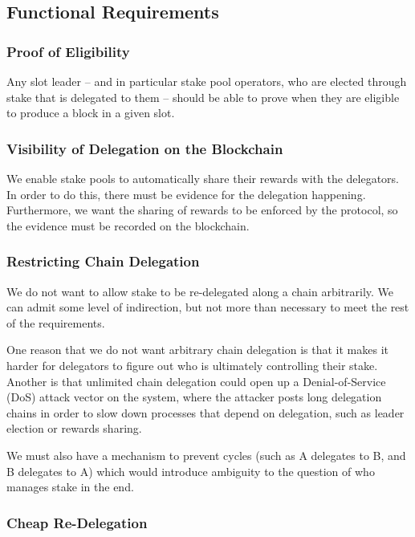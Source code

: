 \documentclass[11pt,a4paper,dvipsnames,twosided]{article}
\begin{document}
\subsection{Functional Requirements}
\label{functional-requirements}

\subsubsection{Proof of Eligibility}
\label{proof-of-eligibility}

Any slot leader -- and in particular stake pool operators, who are
elected through stake that is delegated to them -- should be able to
prove when they are eligible to produce a block in a given slot.

\subsubsection{Visibility of Delegation on the Blockchain}
\label{visibility-of-delegation-on-the-blockchain}

We enable stake pools to automatically share their rewards with the
delegators. In order to do this, there must be evidence for the
delegation happening. Furthermore, we want the sharing of rewards to be
enforced by the protocol, so the evidence must be recorded on the
blockchain.

\subsubsection{Restricting Chain Delegation}
\label{restricting-chain-delegation}

We do not want to allow stake to be re-delegated along a chain
arbitrarily. We can admit some level of indirection, but not more than
necessary to meet the rest of the requirements.

One reason that we do not want arbitrary chain delegation is that it
makes it harder for delegators to figure out who is ultimately
controlling their stake. Another is that unlimited chain delegation
could open up a Denial-of-Service (DoS) attack vector on the system,
where the attacker posts long delegation chains in order to slow down
processes that depend on delegation, such as leader election or rewards
sharing.

We must also have a mechanism to prevent cycles (such as A delegates to
B, and B delegates to A) which would introduce ambiguity to the question
of who manages stake in the end.

\subsubsection{Cheap Re-Delegation}
\label{cheap-re-delegation}
\end{document}
